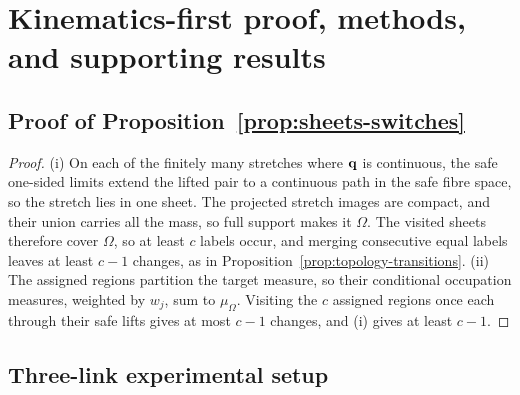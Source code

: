 \section{Kinematics-first proof, methods, and supporting results}
\label{app:kin}

\subsection{Proof of Proposition~\ref{prop:sheets-switches}}
\label{app:kin-proof}
\begin{proof}
  (i) On each of the finitely many stretches where ${\bm{\mathrm{q}}}$ is continuous, the safe one-sided limits extend the lifted pair to a continuous path in the safe fibre space, so the stretch lies in one sheet. The projected stretch images are compact, and their union carries all the mass, so full support makes it $\Omega$. The visited sheets therefore cover $\Omega$, so at least $c$ labels occur, and merging consecutive equal labels leaves at least $c-1$ changes, as in Proposition~\ref{prop:topology-transitions}. (ii) The assigned regions partition the target measure, so their conditional occupation measures, weighted by $w_j$, sum to $\mu_\Omega$. Visiting the $c$ assigned regions once each through their safe lifts gives at most $c-1$ changes, and (i) gives at least $c-1$.
\end{proof}

\subsection{Three-link experimental setup}
\label{app:kin-setup}
